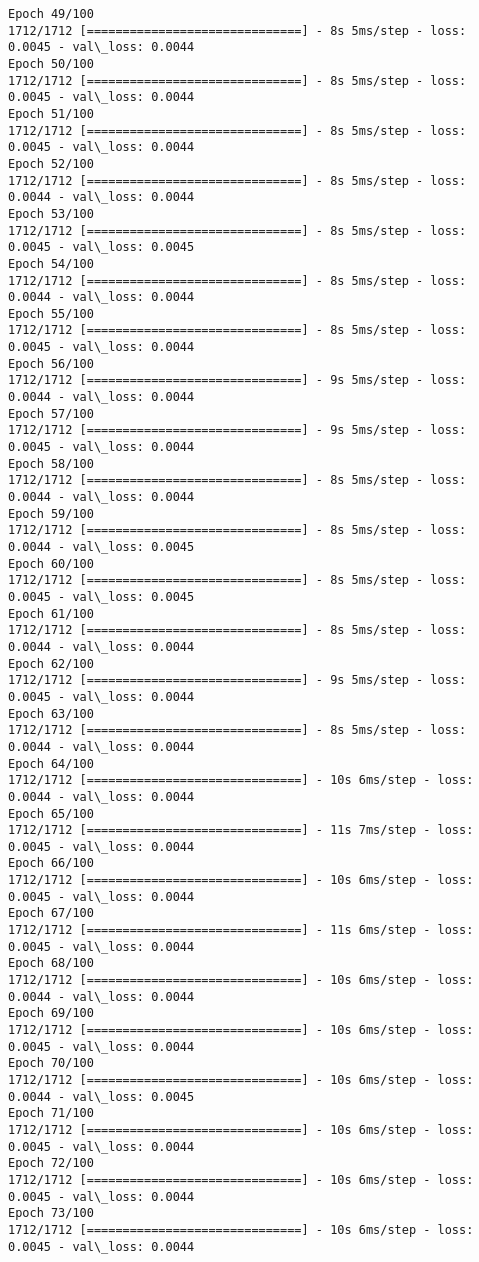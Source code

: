 \documentclass[11pt]{article}
\begin{document}
\begin{Verbatim}[commandchars=\\\{\}]
Epoch 49/100
1712/1712 [==============================] - 8s 5ms/step - loss: 0.0045 - val\_loss: 0.0044
Epoch 50/100
1712/1712 [==============================] - 8s 5ms/step - loss: 0.0045 - val\_loss: 0.0044
Epoch 51/100
1712/1712 [==============================] - 8s 5ms/step - loss: 0.0045 - val\_loss: 0.0044
Epoch 52/100
1712/1712 [==============================] - 8s 5ms/step - loss: 0.0044 - val\_loss: 0.0044
Epoch 53/100
1712/1712 [==============================] - 8s 5ms/step - loss: 0.0045 - val\_loss: 0.0045
Epoch 54/100
1712/1712 [==============================] - 8s 5ms/step - loss: 0.0044 - val\_loss: 0.0044
Epoch 55/100
1712/1712 [==============================] - 8s 5ms/step - loss: 0.0045 - val\_loss: 0.0044
Epoch 56/100
1712/1712 [==============================] - 9s 5ms/step - loss: 0.0044 - val\_loss: 0.0044
Epoch 57/100
1712/1712 [==============================] - 9s 5ms/step - loss: 0.0045 - val\_loss: 0.0044
Epoch 58/100
1712/1712 [==============================] - 8s 5ms/step - loss: 0.0044 - val\_loss: 0.0044
Epoch 59/100
1712/1712 [==============================] - 8s 5ms/step - loss: 0.0044 - val\_loss: 0.0045
Epoch 60/100
1712/1712 [==============================] - 8s 5ms/step - loss: 0.0045 - val\_loss: 0.0045
Epoch 61/100
1712/1712 [==============================] - 8s 5ms/step - loss: 0.0044 - val\_loss: 0.0044
Epoch 62/100
1712/1712 [==============================] - 9s 5ms/step - loss: 0.0045 - val\_loss: 0.0044
Epoch 63/100
1712/1712 [==============================] - 8s 5ms/step - loss: 0.0044 - val\_loss: 0.0044
Epoch 64/100
1712/1712 [==============================] - 10s 6ms/step - loss: 0.0044 - val\_loss: 0.0044
Epoch 65/100
1712/1712 [==============================] - 11s 7ms/step - loss: 0.0045 - val\_loss: 0.0044
Epoch 66/100
1712/1712 [==============================] - 10s 6ms/step - loss: 0.0045 - val\_loss: 0.0044
Epoch 67/100
1712/1712 [==============================] - 11s 6ms/step - loss: 0.0045 - val\_loss: 0.0044
Epoch 68/100
1712/1712 [==============================] - 10s 6ms/step - loss: 0.0044 - val\_loss: 0.0044
Epoch 69/100
1712/1712 [==============================] - 10s 6ms/step - loss: 0.0045 - val\_loss: 0.0044
Epoch 70/100
1712/1712 [==============================] - 10s 6ms/step - loss: 0.0044 - val\_loss: 0.0045
Epoch 71/100
1712/1712 [==============================] - 10s 6ms/step - loss: 0.0045 - val\_loss: 0.0044
Epoch 72/100
1712/1712 [==============================] - 10s 6ms/step - loss: 0.0045 - val\_loss: 0.0044
Epoch 73/100
1712/1712 [==============================] - 10s 6ms/step - loss: 0.0045 - val\_loss: 0.0044

\end{Verbatim}
\end{document}
